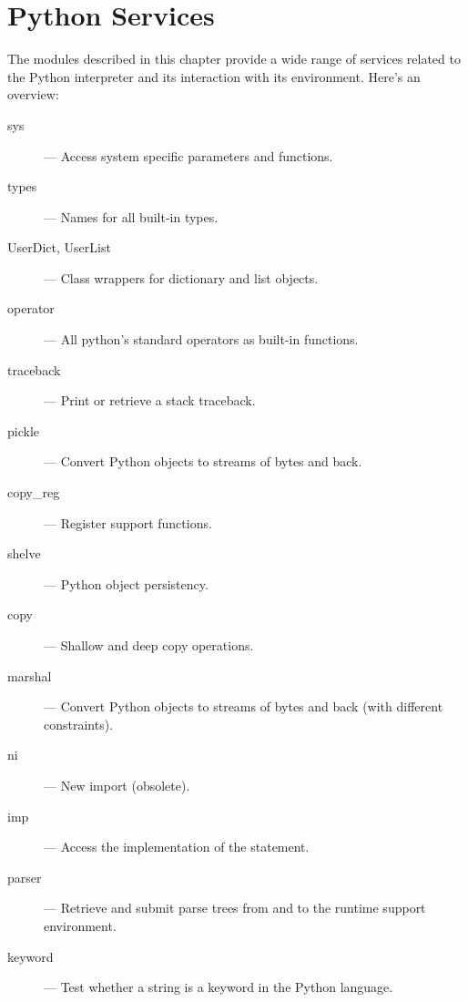 \chapter{Python Services}

The modules described in this chapter provide a wide range of services
related to the Python interpreter and its interaction with its
environment.  Here's an overview:

\begin{description}

\item[sys]
--- Access system specific parameters and functions.

\item[types]
--- Names for all built-in types.

\item[UserDict, UserList]
--- Class wrappers for dictionary and list objects.

\item[operator]
--- All python's standard operators as built-in functions.

\item[traceback]
--- Print or retrieve a stack traceback.

\item[pickle]
--- Convert Python objects to streams of bytes and back.

\item[copy_reg]
--- Register  support functions.

\item[shelve]
--- Python object persistency.

\item[copy]
--- Shallow and deep copy operations.

\item[marshal]
--- Convert Python objects to streams of bytes and back (with
different constraints).

\item[ni]
--- New import (obsolete).

\item[imp]
--- Access the implementation of the  statement.

\item[parser]
--- Retrieve and submit parse trees from and to the runtime support
environment.

\item[keyword]
--- Test whether a string is a keyword in the Python language.


\end{description}
